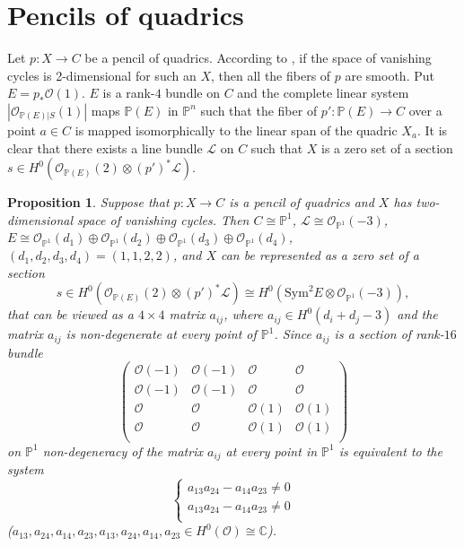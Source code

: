 \documentclass[a4paper]{amsart}
\theoremstyle{plain}
\newtheorem{prop}[theorem]{Proposition}
\theoremstyle{definition}
\begin{document}
\section{Pencils of quadrics}
\label{pencils_of_quadrics}
Let $p \colon X \to C$ be a pencil of quadrics.
According to \cite[Proposition 5.12 and Proposition 5.13]{Lvovski}, if the space of vanishing cycles is 2-dimensional for such an $X$, then all the fibers of $p$ are smooth.
Put $E = p_*\mathcal O(1)$.
$E$ is a rank-$4$ bundle on $C$ and the complete linear system $|\mathcal O_{\mathbb P(E)|S}(1)|$ maps $\mathbb P(E)$ in $\mathbb P^n$ such that the fiber of $p' \colon \mathbb P(E) \to C$ over a point $a \in C$ is mapped isomorphically to the linear span of the quadric $X_a$.
It is clear that there exists a line bundle $\mathcal L$ on $C$ such that $X$ is a zero set of a section $s \in H^0(\mathcal O_{\mathbb P(E)}(2) \otimes (p')^*\mathcal L)$.
\begin{prop}
    Suppose that $p \colon X \to C$ is a pencil of quadrics and $X$ has two-dimensional space of vanishing cycles. Then $C \cong \mathbb P^1$, $\mathcal L \cong \mathcal O_{\mathbb P^1}(-3)$, $E \cong \mathcal O_{\mathbb P^1}(d_1) \oplus \mathcal O_{\mathbb P^1}(d_2) \oplus \mathcal O_{\mathbb P^1}(d_3) \oplus \mathcal O_{\mathbb P^1}(d_4)$, $(d_1, d_2, d_3, d_4) = (1,1,2,2)$,
    and $X$ can be represented as a zero set of a section 
    \[
    s \in H^0(\mathcal O_{\mathbb P(E)}(2)\otimes(p')^*\mathcal L) \cong H^0(\mathrm{Sym}^2 E \otimes \mathcal O_{\mathbb P^1}(-3)),
    \]
    that can be viewed as a $4\times 4$ matrix $a_{ij}$, where $a_{ij} \in H^0(d_i +d_j - 3)$ and the matrix $a_{ij}$ is non-degenerate at every point of $\mathbb P^1$.
    Since $a_{ij}$ is a section of rank-$16$ bundle
    \begin{equation*}
        \begin{pmatrix}
            \mathcal O(-1)&\mathcal O(-1)&\mathcal O    &\mathcal O    \\
            \mathcal O(-1)&\mathcal O(-1)&\mathcal O    &\mathcal O    \\
            \mathcal O   &\mathcal O   &\mathcal O(1)&\mathcal O(1)\\
            \mathcal O   &\mathcal O   &\mathcal O(1)&\mathcal O(1)\\
        \end{pmatrix}
    \end{equation*}
    on $\mathbb P^1$
    non-degeneracy of the matrix $a_{ij}$ at every point in $\mathbb P^1$ is equivalent to the system
    \[
        \left\{
            \begin{array}{rcl}
                a_{13}a_{24}-a_{14}a_{23} \neq 0\\
                a_{13}a_{24}-a_{14}a_{23} \neq 0\\
            \end{array}
        \right.
    \]
    ($a_{13}, a_{24}, a_{14},a_{23},a_{13},a_{24},a_{14},a_{23} \in H^0(\mathcal O) \cong \mathbb C$).
\end{prop}
\end{document}
